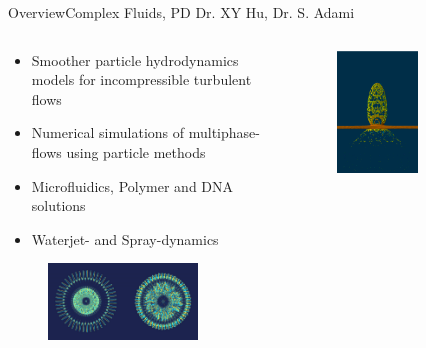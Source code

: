 \documentclass[AERbeamer%
              ,optEnglish%
              ,optBiber%
              ,optBibstyleAlphabetic%
              ,optBeamerClassicFormat%
              ]{AERlatex}%
\begin{document}
\begin{frame}[c]{Overview}{Complex Fluids, PD Dr. XY Hu, Dr. S. Adami}
    \centering
    \begin{columns}[T]
        \begin{column}{0.48\textwidth}
            \begin{itemize}
                \item Smoother particle hydrodynamics models for incompressible turbulent flows
                \item Numerical simulations of multiphase-flows using particle methods
                \item Microfluidics, Polymer and DNA solutions
                \item Waterjet- and Spray-dynamics
            \end{itemize}
            \vspace{0.75cm}
            \begin{figure}
                \centering
                \includegraphics[width=0.8\textwidth]{ComplexFluids1.png}
            \end{figure}
        \end{column}
        \begin{column}{0.48\textwidth}
            \begin{figure}
                \centering
                \includegraphics[width=0.6\textwidth]{ComplexFluids2.png}

\end{figure}
\end{column}
\end{columns}
\end{frame}
\end{document}
